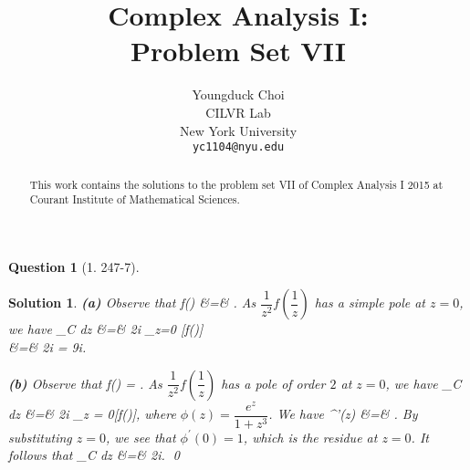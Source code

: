 \documentclass{article} %
\title{Complex Analysis I: \\
Problem Set VII}
\author{
Youngduck Choi \\
CILVR Lab \\
New York University\\
\texttt{yc1104@nyu.edu} \\
}
\def\eQb#1\eQe{\begin{eqnarray*}#1\end{eqnarray*}}
\theoremstyle{quest}
\newtheorem*{question}{Question}
\newtheorem*{solution}{Solution}
\begin{document}
\maketitle

\begin{abstract}
This work contains the solutions to the problem set VII
of Complex Analysis I 2015 at Courant Institute of Mathematical Sciences.
\end{abstract}

\bigskip

\begin{question}[1. 247-7]
\end{question}
\begin{solution}
\textbf{(a)} Observe that
\eQb
\dfrac{1}{z^2}f() &=& .
\eQe
As $\dfrac{1}{z^2}f(\dfrac{1}{z})$ has a simple pole at $z = 0$, we have
\eQb
\int_{C} dz &=& 2\pi i \cdot 
{}_{z=0} [f()] \\
&=& 2\pi i \cdot {}  
= 9\pi i.
\eQe

\smallskip

\textbf{(b)} Observe that
\eQb
\dfrac{1}{z^2}f() = .  
\eQe
As $\dfrac{1}{z^2}f(\dfrac{1}{z})$ has a pole of order $2$ at $z = 0$,
we have
\eQb
\int_{C}  dz &=& 2\pi i 
\cdot {}_{z = 0}[f()],
\eQe
where $\phi(z) = \dfrac{e^z}{1+z^3}$. We have
\eQb
\phi^{'}(z) &=& . 
\eQe
By substituting $z = 0$, we see that $\phi^{'}(0) = 1$, which is the residue
at $z = 0$. It follows that 
\eQb
\int_{C}  dz &=& 2\pi i. 
\eQe
\qed
\end{solution}

\bigskip
\end{document}

